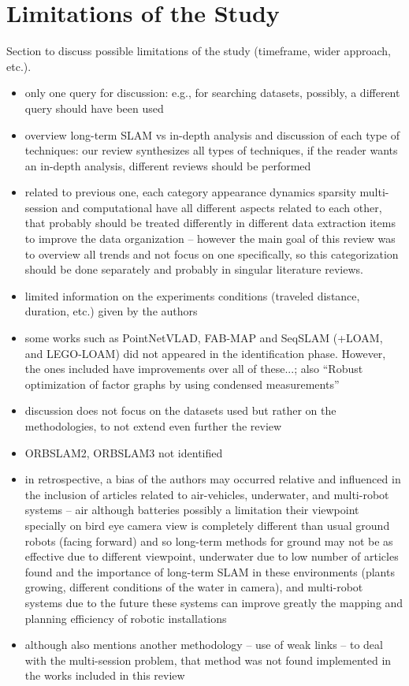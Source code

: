 \section{Limitations of the Study}
\label{sec:limitations}

Section to discuss possible limitations of the study (timeframe, wider approach, etc.).

\begin{itemize}[nosep]
\item only one query for discussion: e.g., for searching datasets, possibly, a different query should have been used
\item overview long-term SLAM vs in-depth analysis and discussion of each type of techniques: our review synthesizes all types of techniques, if the reader wants an in-depth analysis, different reviews should be performed
\item related to previous one, each category appearance dynamics sparsity multi-session and computational have all different aspects related to each other, that probably should be treated differently in different data extraction items to improve the data organization -- however the main goal of this review was to overview all trends and not focus on one specifically, so this categorization should be done separately and probably in singular literature reviews.
\item limited information on the experiments conditions (traveled distance, duration, etc.) given by the authors
\item some works such as PointNetVLAD, FAB-MAP and SeqSLAM (+LOAM, and LEGO-LOAM) did not appeared in the identification phase. However, the ones included have improvements over all of these...; also ``Robust optimization of factor graphs by using condensed measurements''
\item discussion does not focus on the datasets used but rather on the methodologies, to not extend even further the review
\item ORBSLAM2, ORBSLAM3 not identified
\item in retrospective, a bias of the authors may occurred relative and influenced in the inclusion of articles related to air-vehicles, underwater, and multi-robot systems -- air although batteries possibly a limitation their viewpoint specially on bird eye camera view is completely different than usual ground robots (facing forward) and so long-term methods for ground may not be as effective due to different viewpoint, underwater due to low number of articles found and the importance of long-term SLAM in these environments (plants growing, different conditions of the water in camera), and multi-robot systems due to the future these systems can improve greatly the mapping and planning efficiency of robotic installations
\item although \cite{ozog-et-al:2016:21582} also mentions another methodology -- use of weak links -- to deal with the multi-session problem, that method was not found implemented in the works included in this review
\end{itemize}
